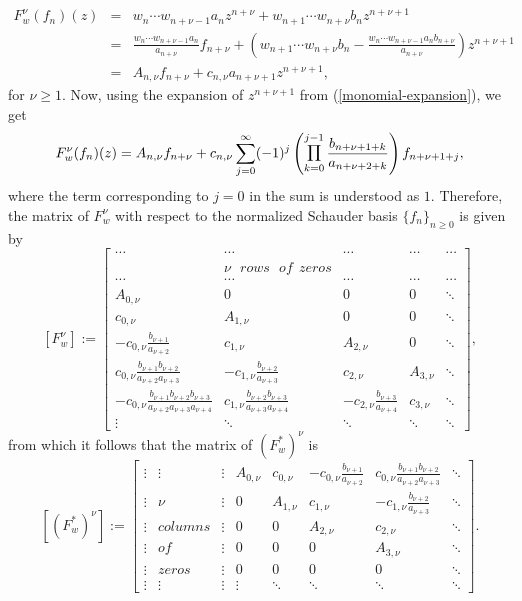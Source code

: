 \documentclass[12pt, reqno]{amsart}
\DeclareMathOperator*{\Mprod}{\text{\raisebox{0.25ex}{\scalebox{0.8}{$\prod$}}}}
\theoremstyle{definition}
\theoremstyle{remark}
\numberwithin{equation}{section}
\begin{document}
    \begin{eqnarray*}
F_{w}^{\nu}(f_{n})(z)&=&w_{n}\cdots w_{n+\nu-1}a_{n}z^{n+\nu}+w_{n+1}\cdots w_{n+\nu}b_{n}z^{n+\nu+1}\\
&=&\frac{w_{n}\cdots w_{n+\nu-1}a_{n}}{a_{n+\nu}}f_{{n+\nu}} + \left(w_{n+1}\cdots w_{n+\nu}b_{n}-\frac{w_{n}\cdots w_{n+\nu-1}a_{n}b_{n+\nu}}{a_{n+\nu}}\right) z^{n+\nu+1}\\
&=&A_{n,\nu}f_{{n+\nu}}+c_{n,\nu}a_{n+\nu+1}z^{n+\nu+1},
\end{eqnarray*}
for $\nu\geq 1$. Now, using the expansion of $z^{n+\nu+1}$ from (\ref{monomial-expansion}), we get
\[
F_{w}^{\nu}(f_{n})(z)=A_{n,\nu}f_{{n+\nu}}+c_{n,\nu}\sum_{j=0}^{\infty}(-1)^{j}\left(\Mprod_{k=0}^{j-1}\frac{b_{n+\nu+1+k}}{a_{n+\nu+2+k}}\right)f_{n+\nu+1+j},
\]
where the term corresponding to $j=0$ in the sum is understood as $1$. Therefore, the matrix of $F_{w}^{\nu}$ with respect to the normalized Schauder basis $\{f_{n}\}_{n\geq 0}$ is given by
$$[F_{w}^{\nu}]:=\begin{bmatrix}
\cdots &\cdots & \cdots&\cdots&\cdots\\
&\nu~~~ rows~~~ of ~~zeros& \\
\cdots &\cdots & \cdots&\cdots&\cdots\\
A_{0,\nu} & 0 & 0&0&\ddots\\
c_{0,\nu} & A_{1,\nu}  & 0&0&\ddots\\
-c_{0,\nu}\frac{b_{\nu+1}}{a_{\nu+2}} & c_{1,\nu} & A_{2,\nu} &0&\ddots\\
 c_{0,\nu}\frac{b_{\nu+1}b_{\nu+2}}{a_{\nu+2}a_{\nu+3}}& -c_{1,\nu}\frac{b_{\nu+2}}{a_{\nu+3}} & c_{2,\nu}&A_{3,\nu}&\ddots\\
-c_{0,\nu}\frac{b_{\nu+1}b_{\nu+2}b_{\nu+3}}{a_{\nu+2}a_{\nu+3}a_{\nu+4}} & c_{1,\nu}\frac{b_{\nu+2}b_{\nu+3}}{a_{\nu+3}a_{\nu+4}} &-c_{2,\nu}\frac{b_{\nu+3}}{a_{\nu+4}} &c_{3,\nu}&\ddots\\
\vdots &\ddots&\ddots&\ddots&\ddots
\end{bmatrix},$$
from which it follows that the matrix of $(F_{w}^{*})^{\nu}$ is
\begin{equation}\label{adoint-matrix}
    [(F_{w}^{*})^{\nu}]:=\begin{bmatrix}
\vdots&\vdots&\vdots&A_{0,\nu} & c_{0,\nu} & -c_{0,\nu}\frac{b_{\nu+1}}{a_{\nu+2}}&c_{0,\nu}\frac{b_{\nu+1}b_{\nu+2}}{a_{\nu+2}a_{\nu+3}}&\ddots\\
\vdots&\nu&\vdots& 0& A_{1,\nu}  & c_{1,\nu} &-c_{1,\nu}\frac{b_{\nu+2}}{a_{\nu+3}}&\ddots\\
\vdots&columns&\vdots&0 & 0& A_{2,\nu} &c_{2,\nu}&\ddots\\
 \vdots&of&\vdots&0& 0 & 0&A_{3,\nu}&\ddots\\
\vdots&zeros&\vdots&0 & 0 &0&0&\ddots\\
\vdots&\vdots&\vdots&\vdots &\ddots&\ddots&\ddots&\ddots
\end{bmatrix}.
\end{equation}
\end{document}
